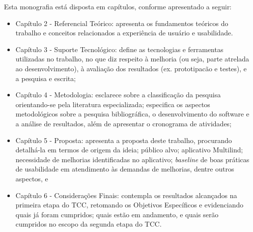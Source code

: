\begin{description}
    \item Esta monografia está disposta em capítulos, conforme apresentado a seguir:
          \begin{itemize}
              \item Capítulo 2 - Referencial Teórico: apresenta os fundamentos teóricos do trabalho e conceitos relacionados a experiência de usuário e usabilidade.

              \item Capítulo 3 - Suporte Tecnológico: define as tecnologias e ferramentas utilizadas no trabalho, no que diz respeito à melhoria (ou seja, parte
              atrelada ao desenvolvimento), à avaliação dos resultados (ex. prototipacão e testes), e a pesquisa e escrita;

              \item Capítulo 4 - Metodologia: esclarece sobre a classificação da pesquisa orientando-se pela literatura especializada; especifica os aspectos
              metodológicos sobre a pesquisa bibliográfica, o desenvolvimento do software e a análise de resultados, além de apresentar o cronograma de atividades;

              \item Capítulo 5 - Proposta: apresenta a proposta deste trabalho, procurando detalhá-la em termos de origem da ideia; público alvo; aplicativo Multilind;
              necessidade de melhorias identificadas no aplicativo; \textit{baseline} de boas práticas de usabilidade em atendimento às demandas de melhorias, dentre
              outros aspectos, e

              \item Capítulo 6 - Considerações Finais: contempla os resultados alcançados na primeira etapa do TCC, retomando os Objetivos Específicos e evidenciando quais já foram
              cumpridos; quais estão em andamento, e quais serão cumpridos no escopo da segunda etapa do TCC.
          \end{itemize}
\end{description}
